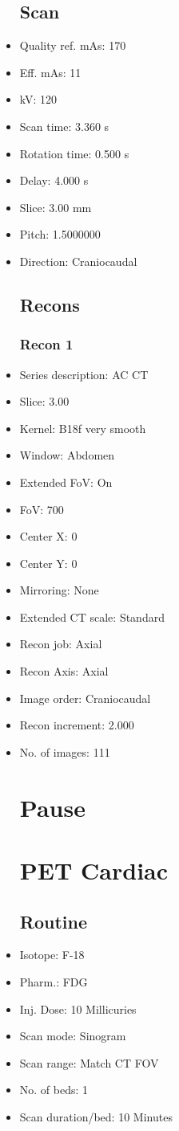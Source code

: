 \documentclass[12pt]{article}
\begin{document}
\begin{itemize}[noitemsep]
\subsection{Scan}
\item Quality ref. mAs: 170\item Eff. mAs: 11\item kV: 120\item Scan time: 3.360 s\item Rotation time: 0.500 s\item Delay: 4.000 s\item Slice: 3.00 mm\item Pitch: 1.5000000\item Direction: Craniocaudal\subsection{Recons}

\subsubsection{Recon 1}
\item Series description: AC CT
\item Slice: 3.00
\item Kernel: B18f very smooth
\item Window: Abdomen
\item Extended FoV: On
\item FoV: 700
\item Center X: 0
\item Center Y: 0
\item Mirroring: None
\item Extended CT scale: Standard
\item Recon job: Axial
\item Recon Axis: Axial
\item Image order: Craniocaudal
\item Recon increment: 2.000
\item No. of images: 111
\section{Pause}
\section{PET Cardiac}\subsection{Routine}
\item Isotope: F-18
\item Pharm.: FDG
\item Inj. Dose: 10 Millicuries
\item Scan mode: Sinogram
\item Scan range: Match CT FOV
\item No. of beds: 1
\item Scan duration/bed: 10 Minutes

\end{itemize}
\end{document}
